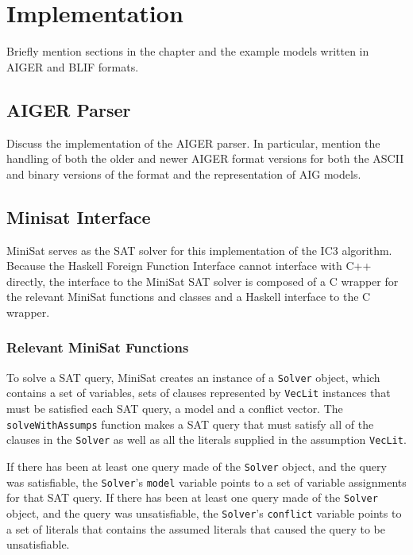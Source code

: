 \documentclass[12pt,a4paper,twoside,openright]{report}
\begin{document}
\chapter{Implementation}
Briefly mention sections in the chapter and the example models
written in AIGER and BLIF formats.

\section{AIGER Parser}
Discuss the implementation of the AIGER parser. In particular, mention
the handling of both the older and newer AIGER format versions for both
the ASCII and binary versions of the format and the representation
of AIG models.

\section{Minisat Interface}

MiniSat serves as the SAT solver for this implementation of the IC3 algorithm.
Because the Haskell Foreign Function Interface cannot interface with C++ directly,
the interface to the MiniSat SAT solver is composed of a C wrapper for the relevant
MiniSat functions and classes and a Haskell interface to the C wrapper.

\subsection{Relevant MiniSat Functions}

To solve a SAT query, MiniSat creates an instance of a \verb,Solver, object,
which contains a set of variables, sets of clauses represented by \verb,VecLit, instances
that must be satisfied each SAT query, a model and a conflict vector.
The \verb,solveWithAssumps, function makes a SAT query that must satisfy all of the clauses
in the \verb,Solver, as well as all the literals supplied in the assumption \verb,VecLit,.

If there has been at least one query made of the \verb,Solver, object, and the query was
satisfiable, the \verb,Solver,'s \verb,model, variable points to a set of variable assignments
for that SAT query.
If there has been at least one query made of the \verb,Solver, object, and the query was
unsatisfiable, the \verb,Solver,'s \verb,conflict, variable points to a set of literals that
contains the assumed literals that caused the query to be unsatisfiable.
\end{document}
